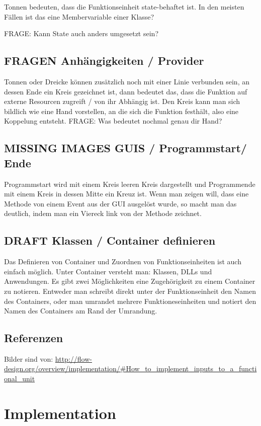 \documentclass[11pt]{article}
\begin{document}
Tonnen bedeuten, dass die Funktionseinheit state-behaftet ist.
In den meisten Fällen ist das eine Membervariable einer Klasse?

FRAGE: Kann State auch anders umgesetzt sein?
\subsection{{\bfseries\sffamily FRAGEN} Anhängigkeiten / Provider}
\label{sec:orgheadline23}

Tonnen oder Dreicke können zusätzlich noch mit einer Linie verbunden sein, an dessen Ende ein Kreis gezeichnet ist,
dann bedeutet das, dass die Funktion auf externe Resourcen zugreift / von ihr
Abhängig ist.
Den Kreis kann man sich bildlich wie eine Hand vorstellen, an die sich die
Funktion festhält, also eine Koppelung entsteht.
FRAGE: Was bedeutet nochmal genau dir Hand?

\subsection{{\bfseries\sffamily MISSING IMAGES} GUIS / Programmstart/ Ende}
\label{sec:orgheadline24}
Programmstart wird mit einem Kreis leeren Kreis dargestellt und Programmende mit
einem Kreis in dessen Mitte ein Kreuz ist.
Wenn man zeigen will, dass eine Methode von einem Event aus der GUI ausgelöst
wurde, so macht man das deutlich, indem man ein Viereck link von der Methode zeichnet.
\subsection{{\bfseries\sffamily DRAFT} Klassen / Container definieren}
\label{sec:orgheadline25}
Das Definieren von Container und Zuordnen von Funktionseinheiten ist auch
einfach möglich. Unter Container versteht man: Klassen, DLLs und Anwendungen.
Es gibt zwei Möglichkeiten eine Zugehörigkeit zu einem Container zu notieren.
Entweder man schreibt direkt unter der Funktionseinheit den Namen des
Containers, oder man umrandet mehrere Funktioneseinheiten und notiert den Namen
des Containers am Rand der Umrandung.
\subsection{Referenzen}
\label{sec:orgheadline26}
Bilder sind von: 
\url{http://flow-design.org/overview/implementation/#How_to_implement_inputs_to_a_functional_unit}

\section{Implementation}
\label{sec:orgheadline64}
\end{document}
